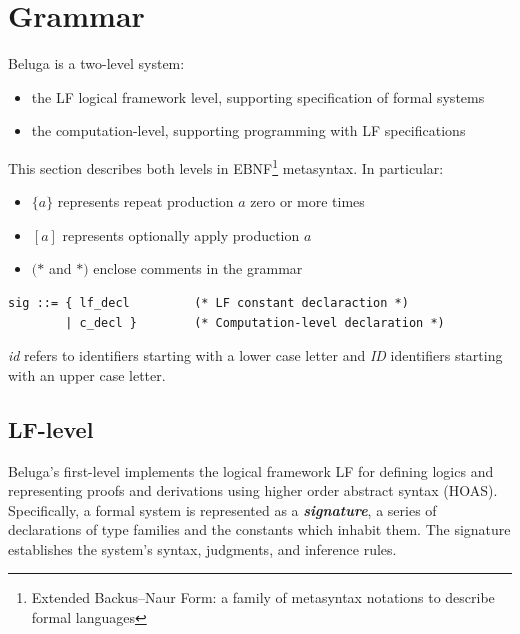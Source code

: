\documentclass[11pt]{article}
\begin{document}

\section{Grammar}
Beluga is a two-level system:
\begin{itemize}
\item the LF logical framework level, supporting specification of formal systems
\item the computation-level, supporting programming with LF specifications
\end{itemize}

This section describes both levels in EBNF\footnote{Extended Backus–Naur Form: a family of metasyntax notations to describe formal languages} metasyntax. In particular:
\begin{itemize}
\item $\{a\}$ represents repeat production $a$ zero or more times 
\item $[a]$ represents optionally apply production $a$ 
\item $(*$ and $*)$ enclose comments in the grammar
\end{itemize}
\begin{verbatim}
sig ::= { lf_decl         (* LF constant declaraction *)
        | c_decl }        (* Computation-level declaration *)
\end{verbatim}
\textit{id} refers to identifiers starting with a lower case letter and \textit{ID} identifiers starting with an upper case letter.



\subsection{LF-level}
Beluga's first-level implements the logical framework LF for defining logics and representing proofs and derivations using higher order abstract syntax (HOAS). Specifically, a formal system is represented as a \textit{\textbf{signature}}, a series of declarations of type families and the constants which inhabit them. The signature establishes the system's syntax, judgments, and inference rules. 
\end{document}
